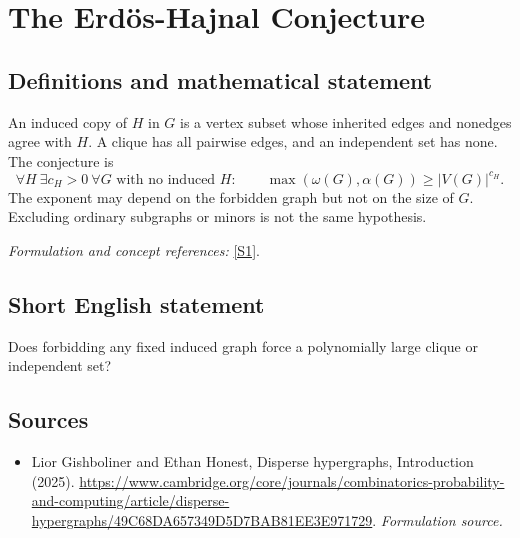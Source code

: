 \documentclass[11pt]{article}
\begin{document}
\section*{\texorpdfstring{The Erdös-Hajnal Conjecture}{The Erdös-Hajnal Conjecture}}\label{statement}
\subsection{Definitions and mathematical statement}
An induced copy of $H$ in $G$ is a vertex subset whose inherited edges and nonedges agree with $H$. A clique has all pairwise edges, and an independent set has none. The conjecture is
\[
 \forall H\ \exists c_H>0\ \forall G\text{ with no induced }H:\qquad
 \max(\omega(G),\alpha(G))\ge |V(G)|^{c_H}.
\]
The exponent may depend on the forbidden graph but not on the size of $G$. Excluding ordinary subgraphs or minors is not the same hypothesis.
\par\smallskip\textit{Formulation and concept references:} \href{https://www.cambridge.org/core/journals/combinatorics-probability-and-computing/article/disperse-hypergraphs/49C68DA657349D5D7BAB81EE3E971729}{[S1]}.

\subsection{Short English statement}
Does forbidding any fixed induced graph force a polynomially large clique or independent set?
\subsection{Sources}
\begin{itemize}
\item[S1]Lior Gishboliner and Ethan Honest, Disperse hypergraphs, Introduction (2025).
\url{https://www.cambridge.org/core/journals/combinatorics-probability-and-computing/article/disperse-hypergraphs/49C68DA657349D5D7BAB81EE3E971729}.
\textit{Formulation source.}
\end{itemize}
\end{document}
